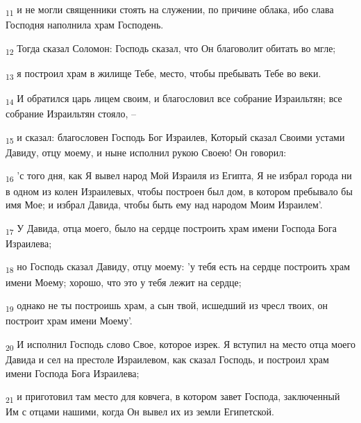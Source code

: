 \begin{tcolorbox}
\textsubscript{11} и не могли священники стоять на служении, по причине облака, ибо слава Господня наполнила храм Господень.
\end{tcolorbox}
\begin{tcolorbox}
\textsubscript{12} Тогда сказал Соломон: Господь сказал, что Он благоволит обитать во мгле;
\end{tcolorbox}
\begin{tcolorbox}
\textsubscript{13} я построил храм в жилище Тебе, место, чтобы пребывать Тебе во веки.
\end{tcolorbox}
\begin{tcolorbox}
\textsubscript{14} И обратился царь лицем своим, и благословил все собрание Израильтян; все собрание Израильтян стояло, --
\end{tcolorbox}
\begin{tcolorbox}
\textsubscript{15} и сказал: благословен Господь Бог Израилев, Который сказал Своими устами Давиду, отцу моему, и ныне исполнил рукою Своею! Он говорил:
\end{tcolorbox}
\begin{tcolorbox}
\textsubscript{16} 'с того дня, как Я вывел народ Мой Израиля из Египта, Я не избрал города ни в одном из колен Израилевых, чтобы построен был дом, в котором пребывало бы имя Мое; и избрал Давида, чтобы быть ему над народом Моим Израилем'.
\end{tcolorbox}
\begin{tcolorbox}
\textsubscript{17} У Давида, отца моего, было на сердце построить храм имени Господа Бога Израилева;
\end{tcolorbox}
\begin{tcolorbox}
\textsubscript{18} но Господь сказал Давиду, отцу моему: 'у тебя есть на сердце построить храм имени Моему; хорошо, что это у тебя лежит на сердце;
\end{tcolorbox}
\begin{tcolorbox}
\textsubscript{19} однако не ты построишь храм, а сын твой, исшедший из чресл твоих, он построит храм имени Моему'.
\end{tcolorbox}
\begin{tcolorbox}
\textsubscript{20} И исполнил Господь слово Свое, которое изрек. Я вступил на место отца моего Давида и сел на престоле Израилевом, как сказал Господь, и построил храм имени Господа Бога Израилева;
\end{tcolorbox}
\begin{tcolorbox}
\textsubscript{21} и приготовил там место для ковчега, в котором завет Господа, заключенный Им с отцами нашими, когда Он вывел их из земли Египетской.
\end{tcolorbox}
